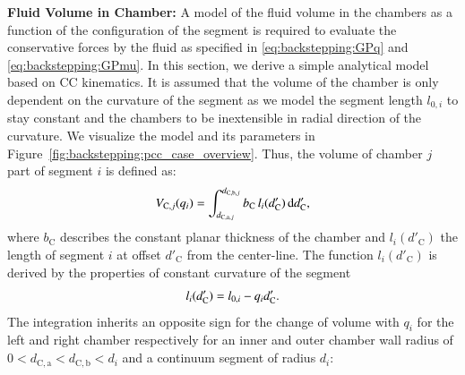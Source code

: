\textbf{Fluid Volume in Chamber:}
A model of the fluid volume in the chambers as a function of the configuration of the segment is required to evaluate the conservative forces by the fluid as specified in \eqref{eq:backstepping:GPq} and \eqref{eq:backstepping:GPmu}. In this section, we derive a simple analytical model based on \gls{CC} kinematics.
It is assumed that the volume of the chamber is only dependent on the curvature of the segment as we model the segment length $l_{0,i}$ to stay constant and the chambers to be inextensible in radial direction of the curvature. We visualize the model and its parameters in Figure~\ref{fig:backstepping:pcc_case_overview}. Thus, the volume of chamber $j$ part of segment $i$ is defined as:
\begin{equation}\small
    V_{\mathrm{C},j}(q_i) = \int_{d_{\mathrm{C},\mathrm{a},j}}^{d_{\mathrm{C},\mathrm{b},j}} b_\mathrm{C} \, l_i(d_\mathrm{C}') \, \mathrm{d}d_\mathrm{C}',
\end{equation}
where $b_\mathrm{C}$ describes the constant planar thickness of the chamber and $l_i(d'_\mathrm{C})$ the length of segment $i$ at offset $d'_\mathrm{C}$ from the center-line. 
The function $l_i(d'_\mathrm{C})$ is derived by the properties of constant curvature of the segment
\begin{equation}\small
    l_i(d'_\mathrm{C}) = l_{0,i} - q_i d'_\mathrm{C}.
\end{equation}
The integration inherits an opposite sign for the change of volume with $q_i$ for the left and right chamber respectively for an inner and outer chamber wall radius of $0 < d_{\mathrm{C},\mathrm{a}} < d_{\mathrm{C},\mathrm{b}} < d_i$ and a continuum segment of radius $d_i$:
